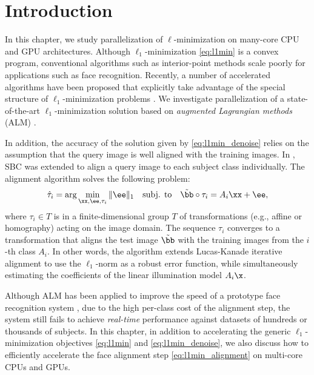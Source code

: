 \section{Introduction} 
%

In this chapter, we study parallelization of $\ell$-minimization on many-core CPU and GPU
architectures. Although $\ell_1$-minimization \eqref{eq:l1min} is a convex
program, conventional algorithms such as interior-point methods
\cite{ChenS2001-SIAM,TibshiraniR1996} scale poorly
for applications such as face recognition. Recently, a number of
accelerated algorithms have been proposed that explicitly take advantage of
the special structure of $\ell_1$-minimization problems
\cite{LorisI2009,YangA2010-ICIP}. We investigate parallelization of a
state-of-the-art $\ell_1$-minimization solution based on
\emph{augmented Lagrangian methods} (ALM) \cite{BertsekasD2003,YangA2010-ICIP}.

In addition, the accuracy of the solution given by \eqref{eq:l1min_denoise} relies on the assumption
that the query image is well aligned with the training images.
In \cite{WagnerA2009-CVPR}, SBC was extended to align
a query image to each subject class individually. The alignment algorithm solves
the following problem:
\begin{equation}
\hat{\tau}_i = \arg\min_{\xx, \ee, \tau_i} \|\ee\|_1\quad \mbox{subj. to}\quad \tilde\bb\circ\tau_i = A_i\xx + \ee,
\label{eq:l1min_alignment}
\end{equation}
where $\tau_i\in T$ is in a finite-dimensional group $T$ of transformations
(e.g., affine or homography) acting on the image domain.  The sequence
$\tau_i$ converges to a transformation that aligns the test image $\tilde\bb$
with the training images from the $i$-th class $A_i$. In other words, the algorithm 
extends Lucas-Kanade iterative alignment \cite{LucasB1981} to use the
$\ell_1$-norm as a robust error function, while simultaneously estimating
the coefficients of the linear illumination model $A_i\x$.  

Although ALM has been applied to improve the speed of a prototype face recognition system \cite{WagnerA2011-PAMI},
due to the high per-class cost
of the alignment step, the system still fails to achieve \emph{real-time}
performance against datasets of hundreds or thousands of subjects.  In this chapter,
in addition to accelerating the generic
$\ell_1$-minimization objectives \eqref{eq:l1min} and \eqref{eq:l1min_denoise}, we 
also discuss how to efficiently accelerate the face alignment step
\eqref{eq:l1min_alignment} on multi-core CPUs and GPUs.

